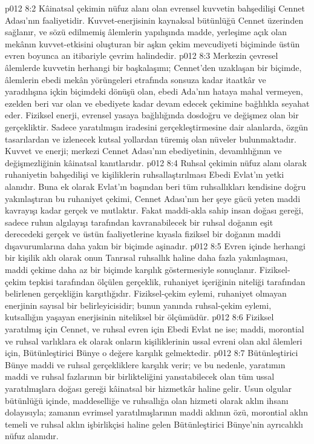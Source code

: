\vs p012 8:2 Kâinatsal çekimin nüfuz alanı olan evrensel kuvvetin bahşedilişi Cennet Adası’nın faaliyetidir. Kuvvet\hyp{}enerjisinin kaynaksal bütünlüğü Cennet üzerinden sağlanır, ve sözü edilmemiş âlemlerin yapılışında madde, yerleşime açık olan mekânın kuvvet\hyp{}etkisini oluşturan bir aşkın çekim mevcudiyeti biçiminde üstün evren boyunca an itibariyle çevrim halindedir.
\vs p012 8:3 Merkezin çevresel âlemlerde kuvvetin herhangi bir başkalaşımı; Cennet’den uzaklaşan bir biçimde, âlemlerin ebedi mekân yörüngeleri etrafında sonsuza kadar itaatkâr ve yaradılışına içkin biçimdeki dönüşü olan, ebedi Ada’nın hataya mahal vermeyen, ezelden beri var olan ve ebediyete kadar devam edecek çekimine bağlılıkla seyahat eder. Fiziksel enerji, evrensel yasaya bağlılığında dosdoğru ve değişmez olan bir gerçekliktir. Sadece yaratılmışın iradesini gerçekleştirmesine dair alanlarda, özgün tasarılardan ve izlenecek kutsal yollardan türemiş olan nüveler bulunmaktadır. Kuvvet ve enerji; merkezi Cennet Adası’nın ebediyetinin, devamlılığının ve değişmezliğinin kâinatsal kanıtlarıdır.
\vs p012 8:4 Ruhsal çekimin nüfuz alanı olarak ruhaniyetin bahşedilişi ve kişiliklerin ruhsallaştırılması Ebedi Evlat’ın yetki alanıdır. Buna ek olarak Evlat’ın başından beri tüm ruhsallıkları kendisine doğru yakınlaştıran bu ruhaniyet çekimi, Cennet Adası’nın her şeye gücü yeten maddi kavrayışı kadar gerçek ve mutlaktır. Fakat maddi\hyp{}akla sahip insan doğası gereği, sadece ruhun algılayışı tarafından kavranabilecek bir ruhsal doğanın eşit derecedeki gerçek ve üstün faaliyetlerine kıyasla fiziksel bir doğanın maddi dışavurumlarına daha yakın bir biçimde aşinadır.
\vs p012 8:5 Evren içinde herhangi bir kişilik aklı olarak onun Tanrısal ruhsallık haline daha fazla yakınlaşması, maddi çekime daha az bir biçimde karşılık göstermesiyle sonuçlanır. Fiziksel\hyp{}çekim tepkisi tarafından ölçülen gerçeklik, ruhaniyet içeriğinin niteliği tarafından belirlenen gerçekliğin karşıtlığıdır. Fiziksel\hyp{}çekim eylemi, ruhaniyet olmayan enerjinin sayısal bir belirleyicisidir; bunun yanında ruhsal\hyp{}çekim eylemi, kutsallığın yaşayan enerjisinin niteliksel bir ölçümüdür.
\vs p012 8:6 Fiziksel yaratılmış için Cennet, ve ruhsal evren için Ebedi Evlat ne ise; maddi, morontial ve ruhsal varlıklara ek olarak onların kişiliklerinin ussal evreni olan akıl âlemleri için, Bütünleştirici Bünye o değere karşılık gelmektedir.
\vs p012 8:7 Bütünleştirici Bünye maddi ve ruhsal gerçekliklere karşılık verir; ve bu nedenle, yaratımın maddi ve ruhsal fazlarının bir birlikteliğini yansıtabilecek olan tüm ussal yaratılmışlara doğası gereği kâinatsal bir hizmetkâr haline gelir. Usun olgular bütünlüğü içinde, maddeselliğe ve ruhsallığa olan hizmeti olarak aklın ihsanı dolayısıyla; zamanın evrimsel yaratılmışlarının maddi aklının özü, morontial aklın temeli ve ruhsal aklın işbirlikçisi haline gelen Bütünleştirici Bünye’nin ayrıcalıklı nüfuz alanıdır.
